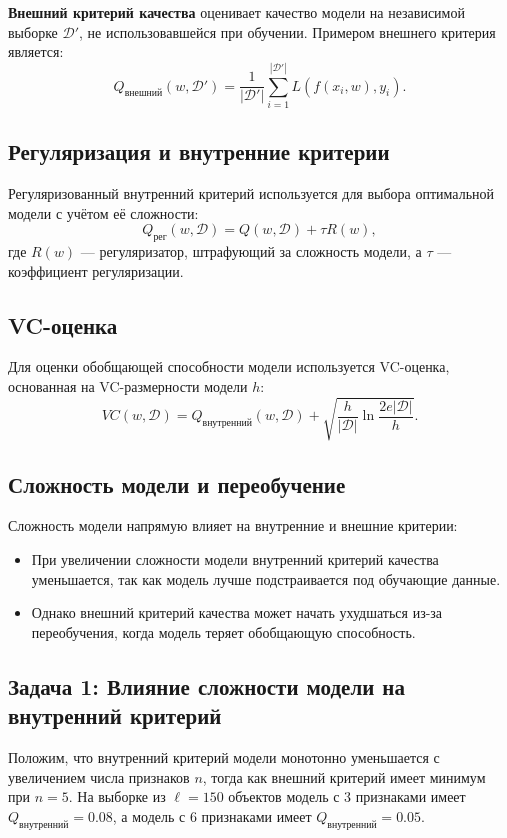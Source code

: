 \textbf{Внешний критерий качества} оценивает качество модели на независимой выборке $\mathcal{D}'$, не использовавшейся при обучении. Примером внешнего критерия является:
\[
Q_{\text{внешний}}(w, \mathcal{D}') = \frac{1}{|\mathcal{D}'|} \sum_{i=1}^{|\mathcal{D}'|} L(f(x_i, w), y_i).
\]

\subsection*{Регуляризация и внутренние критерии}
Регуляризованный внутренний критерий используется для выбора оптимальной модели с учётом её сложности:
\[
Q_{\text{рег}}(w, \mathcal{D}) = Q(w, \mathcal{D}) + \tau R(w),
\]
где $R(w)$ --- регуляризатор, штрафующий за сложность модели, а $\tau$ --- коэффициент регуляризации.

\subsection*{VC-оценка}
Для оценки обобщающей способности модели используется VC-оценка, основанная на VC-размерности модели $h$:
\[
VC(w, \mathcal{D}) = Q_{\text{внутренний}}(w, \mathcal{D}) + \sqrt{\frac{h}{|\mathcal{D}|} \ln \frac{2e|\mathcal{D}|}{h}}.
\]

\subsection*{Сложность модели и переобучение}
Сложность модели напрямую влияет на внутренние и внешние критерии:
\begin{itemize}
    \item При увеличении сложности модели внутренний критерий качества уменьшается, так как модель лучше подстраивается под обучающие данные.
    \item Однако внешний критерий качества может начать ухудшаться из-за переобучения, когда модель теряет обобщающую способность.
\end{itemize}

\subsection*{Задача 1: Влияние сложности модели на внутренний критерий}

Положим, что внутренний критерий модели монотонно уменьшается с увеличением числа признаков $n$, тогда как внешний критерий имеет минимум при $n = 5$. На выборке из $\ell = 150$ объектов модель с 3 признаками имеет $Q_{\text{внутренний}} = 0.08$, а модель с 6 признаками имеет $Q_{\text{внутренний}} = 0.05$. 

